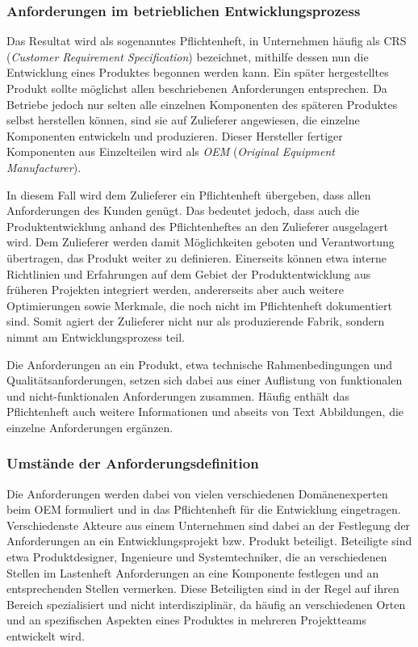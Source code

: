 \documentclass[12pt]{report}
\begin{document}
\subsubsection{Anforderungen im betrieblichen Entwicklungsprozess}
Das Resultat wird als sogenanntes Pflichtenheft, in Unternehmen häufig als CRS (\textit{Customer Requirement Specification}) bezeichnet, mithilfe dessen nun die Entwicklung eines Produktes begonnen werden kann. Ein später hergestelltes Produkt sollte möglichst allen beschriebenen Anforderungen entsprechen. Da Betriebe jedoch nur selten alle einzelnen Komponenten des späteren Produktes selbst herstellen können, sind sie auf Zulieferer angewiesen, die einzelne Komponenten entwickeln und produzieren. Dieser Hersteller fertiger Komponenten aus Einzelteilen wird als \textit{OEM} (\textit{Original Equipment Manufacturer}). 

In diesem Fall wird dem Zulieferer ein Pflichtenheft übergeben, dass allen Anforderungen des Kunden genügt. Das bedeutet jedoch, dass auch die Produktentwicklung anhand des Pflichtenheftes an den Zulieferer ausgelagert wird. Dem Zulieferer werden damit Möglichkeiten geboten und Verantwortung übertragen, das Produkt weiter zu definieren. Einerseits können etwa interne Richtlinien und Erfahrungen auf dem Gebiet der Produktentwicklung aus früheren Projekten integriert werden, andererseits aber auch weitere Optimierungen sowie Merkmale, die noch nicht im Pflichtenheft dokumentiert sind. Somit agiert der Zulieferer nicht nur als produzierende Fabrik, sondern nimmt am Entwicklungsprozess teil.

Die Anforderungen an ein Produkt, etwa technische Rahmenbedingungen und Qualitätsanforderungen, setzen sich dabei aus einer Auflistung von funktionalen und nicht-funktionalen Anforderungen zusammen. Häufig enthält das Pflichtenheft auch weitere Informationen und abseits von Text Abbildungen, die einzelne Anforderungen ergänzen. 

\subsubsection{Umstände der Anforderungsdefinition}
Die Anforderungen werden dabei von vielen verschiedenen Domänenexperten beim OEM formuliert und in das Pflichtenheft für die Entwicklung eingetragen. Verschiedenste Akteure aus einem Unternehmen sind dabei an der Festlegung der Anforderungen an ein Entwicklungsprojekt bzw. Produkt beteiligt. Beteiligte sind etwa Produktdesigner, Ingenieure und Systemtechniker, die an verschiedenen Stellen im Lastenheft Anforderungen an eine Komponente festlegen und an entsprechenden Stellen vermerken. Diese Beteiligten sind in der Regel auf ihren Bereich spezialisiert und nicht interdisziplinär, da häufig an verschiedenen Orten und an spezifischen Aspekten eines Produktes in mehreren Projektteams entwickelt wird. 
\end{document}
